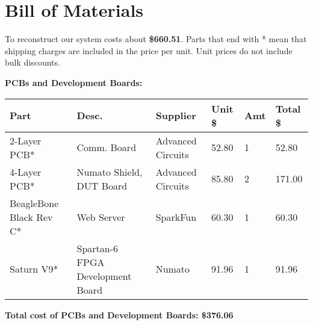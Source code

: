 \section{Bill of Materials}

To reconstruct our system costs about \textbf{\$660.51}. Parts that end with * mean that shipping charges are included in the price per unit. Unit prices do not include bulk discounts.


\begin{flushleft}
\textbf{PCBs and Development Boards:}
\end{flushleft}
\begin{center}
    \begin{tabular}{| p{} | p{} | p{} | p{} | p{} | p{} |}
    \hline
    Part & Desc. & Supplier & Unit \$ & Amt & Total \$ \\ \hline
    2-Layer PCB* & Comm. Board & Advanced Circuits & 52.80 & 1 & 52.80 \\ \hline
    4-Layer PCB* & Numato Shield, DUT Board & Advanced Circuits & 85.80 & 2 & 171.00 \\ \hline
    BeagleBone Black Rev C* & Web Server & SparkFun & 60.30 & 1 & 60.30 \\ \hline
    Saturn V9* & Spartan-6 FPGA Development Board & Numato & 91.96 & 1 & 91.96 \\ \hline
    \end{tabular}
\end{center}
\textbf{Total cost of PCBs and Development Boards: \$376.06}

\pagebreak

